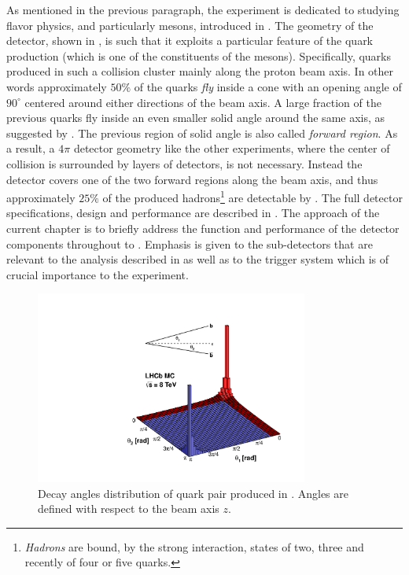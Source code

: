 As mentioned in the previous paragraph, the \lhcb experiment is dedicated to studying flavor physics,
and particularly \B mesons, introduced in . The geometry of the \lhcb detector,
shown in , is such that it exploits a particular feature of the
\bquark quark production (which is one of the constituents of the \B mesons). Specifically, \bquark quarks
produced in such a collision cluster mainly along the proton beam axis. In other words approximately $50\%$
of the \bquark quarks {\it fly} inside a cone with an opening angle of $90^\circ$ centered around
either directions of the beam axis. A large fraction of the previous quarks fly inside an even smaller
solid angle around the same axis, as suggested by . The previous region of solid
angle is also called {\it forward region}.
As a result, a $4\pi$ detector geometry like the other \lhc experiments, where the center of collision
is surrounded by layers of detectors, is not necessary. Instead the \lhcb detector covers one of the two
forward regions along the beam axis, and thus approximately $25\%$ of the produced \bquark
hadrons\footnote{ {\it Hadrons} are bound, by the strong interaction, states of two,
three and recently \cite{Aaij:2016nsc} of four or five quarks.} are detectable by \lhcb.
The full \lhcb detector specifications, design and performance are described in \cite{Aaij:2014jba}.
The approach of the current chapter is to briefly address the function and performance of the detector components
throughout  to . Emphasis is given to the sub-detectors that are relevant
to the analysis described in  as well as to the trigger system which is of crucial importance
to the \lhcb experiment.

\begin{figure}[t]
  \centering
  \includegraphics[width=0.8\textwidth, trim=0cm 0cm 0cm 2.5cm, clip=true]{Figures/Chapter2/08_rad_acc_scheme_right}
  \caption{Decay angles distribution of \bquark quark pair produced in \lhcb. Angles are defined with
           respect to the beam axis $z$.}
  \label{bb_roduction_angles}
\end{figure}
